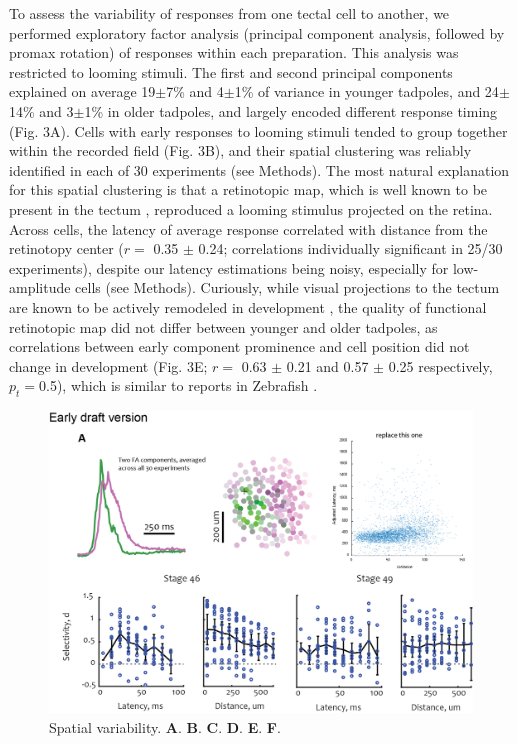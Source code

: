 \documentclass{article}
\begin{document}
To assess the variability of responses from one tectal cell to another, we performed exploratory factor analysis (principal component analysis, followed by promax rotation) of responses within each preparation. This analysis was restricted to looming stimuli. The first and second principal components explained on average 19$\pm$7\% and 4$\pm$1\% of variance in younger tadpoles, and 24$\pm$14\% and 3$\pm$1\% in older tadpoles, and largely encoded different response timing (Fig. 3A). Cells with early responses to looming stimuli tended to group together within the recorded field (Fig. 3B), and their spatial clustering was reliably identified in each of 30 experiments (see Methods). The most natural explanation for this spatial clustering is that a retinotopic map, which is well known to be present in the tectum \citep{ruthazer2004map}, reproduced a looming stimulus projected on the retina. Across cells, the latency of average response correlated with distance from the retinotopy center ($r=$ 0.35 $\pm$ 0.24; correlations individually significant in 25/30 experiments), despite our latency estimations being noisy, especially for low-amplitude cells (see Methods). Curiously, while visual projections to the tectum are known to be actively remodeled in development \citep{sakaguchi1985refinement,ruthazer2004map,munz2014hebbian}, the quality of functional retinotopic map did not differ between younger and older tadpoles, as correlations between early component prominence and cell position did not change in development (Fig. 3E; $r=$ 0.63 $\pm$ 0.21 and 0.57 $\pm$ 0.25 respectively, $p_t= $0.5), which is similar to reports in Zebrafish \citep{avitan2016limitations}.

\begin{figure}
\includegraphics[width=\linewidth]{fig3.png}
\caption{
Spatial variability. \textbf{A}. \textbf{B}. \textbf{C}. \textbf{D}. \textbf{E}. \textbf{F}. }
\end{figure}
\end{document}
